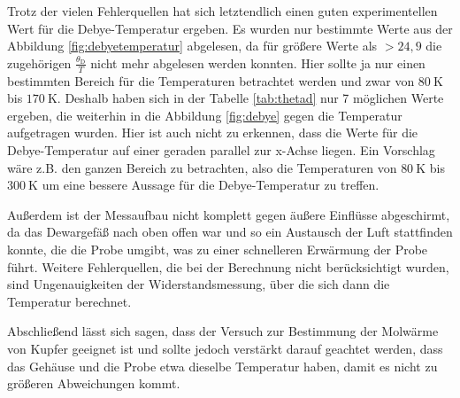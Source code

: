 Trotz der vielen Fehlerquellen hat sich letztendlich einen guten experimentellen Wert für die Debye-Temperatur ergeben. Es wurden nur bestimmte Werte aus der Abbildung \ref{fig:debyetemperatur} abgelesen, da für größere Werte als $> 24,9$ die zugehörigen $\frac{\theta_\text{D}}{T}$ nicht mehr abgelesen werden konnten. Hier sollte ja nur einen bestimmten Bereich für die Temperaturen betrachtet werden und zwar von $\SI{80}{\kelvin}$ bis $\SI{170}{\kelvin}$. Deshalb haben sich in der Tabelle \ref{tab:thetad} nur 7 möglichen Werte ergeben, die weiterhin in die Abbildung \ref{fig:debye} gegen die Temperatur aufgetragen wurden. Hier ist auch nicht zu erkennen, dass die Werte für die Debye-Temperatur auf einer geraden parallel zur x-Achse liegen. Ein Vorschlag wäre z.B. den ganzen Bereich zu betrachten, also die Temperaturen von $\SI{80}{\kelvin}$ bis $\SI{300}{\kelvin}$ um eine bessere Aussage für die Debye-Temperatur zu treffen.

Außerdem ist der Messaufbau nicht komplett gegen äußere Einflüsse abgeschirmt, da das Dewargefäß nach oben offen war und so ein Austausch der Luft stattfinden konnte, die die Probe umgibt, was zu einer schnelleren Erwärmung der Probe führt. Weitere Fehlerquellen, die bei der Berechnung nicht berücksichtigt wurden, sind Ungenauigkeiten der Widerstandsmessung, über die sich dann die Temperatur berechnet. 

Abschließend lässt sich sagen, dass der Versuch zur Bestimmung der Molwärme von Kupfer geeignet ist und sollte jedoch verstärkt darauf geachtet werden, dass das Gehäuse und die Probe etwa dieselbe Temperatur haben, damit es nicht zu größeren Abweichungen kommt.